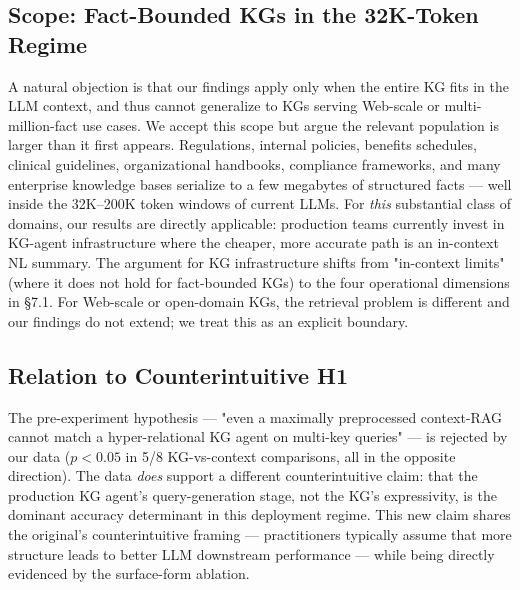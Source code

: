 \subsection{Scope: Fact-Bounded KGs in the 32K-Token Regime}

A natural objection is that our findings apply only when the entire
KG fits in the LLM context, and thus cannot generalize to KGs serving
Web-scale or multi-million-fact use cases. We accept this scope but
argue the relevant population is larger than it first appears.
Regulations, internal policies, benefits schedules, clinical
guidelines, organizational handbooks, compliance frameworks, and many
enterprise knowledge bases serialize to a few megabytes of structured
facts — well inside the 32K--200K token windows of current LLMs. For
\emph{this} substantial class of domains, our results are directly
applicable: production teams currently invest in KG-agent
infrastructure where the cheaper, more accurate path is an in-context
NL summary. The argument for KG infrastructure shifts from "in-context
limits" (where it does not hold for fact-bounded KGs) to the four
operational dimensions in \S7.1. For Web-scale or open-domain KGs, the
retrieval problem is different and our findings do not extend; we
treat this as an explicit boundary.

\subsection{Relation to Counterintuitive H1}

The pre-experiment hypothesis — "even a maximally preprocessed
context-RAG cannot match a hyper-relational KG agent on multi-key
queries" — is rejected by our data ($p<0.05$ in 5/8 KG-vs-context
comparisons, all in the opposite direction). The data
\emph{does} support a different counterintuitive claim: that the
production KG agent's query-generation stage, not the KG's
expressivity, is the dominant accuracy determinant in this
deployment regime. This new claim shares the original's
counterintuitive framing — practitioners typically assume that more
structure leads to better LLM downstream performance — while being
directly evidenced by the surface-form ablation.
